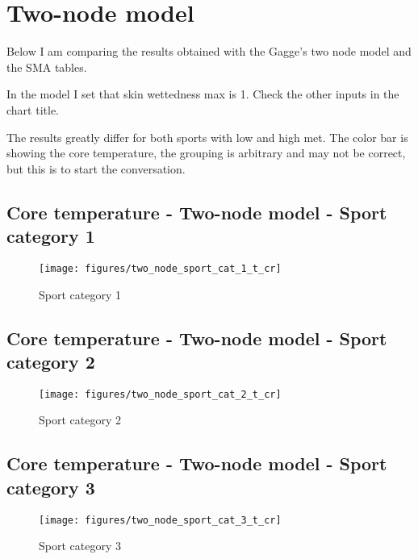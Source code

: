 \documentclass[11pt]{article}
\begin{document}
    \section{Two-node model}\label{sec:two-node-model}

    Below I am comparing the results obtained with the Gagge's two node model and the SMA tables.

    In the model I set that skin wettedness max is 1.
    Check the other inputs in the chart title.

    The results greatly differ for both sports with low and high met.
    The color bar is showing the core temperature, the grouping is arbitrary and may not be correct, but this is to start the conversation.

    \subsection{Core temperature - Two-node model - Sport category 1}
    \begin{figure}[htb!]
        \centering
        \texttt{[image: figures/two\_node\_sport\_cat\_1\_t\_cr]}
        \caption{Sport category 1}\label{fig:two_node_sport_cat_1}
    \end{figure}

    \clearpage

    \subsection{Core temperature - Two-node model - Sport category 2}
    \begin{figure}[htb!]
        \centering
        \texttt{[image: figures/two\_node\_sport\_cat\_2\_t\_cr]}
        \caption{Sport category 2}\label{fig:two_node_sport_cat_2}
    \end{figure}

    \clearpage

    \subsection{Core temperature - Two-node model - Sport category 3}
    \begin{figure}[htb!]
        \centering
        \texttt{[image: figures/two\_node\_sport\_cat\_3\_t\_cr]}
        \caption{Sport category 3}\label{fig:two_node_sport_cat_3}
    \end{figure}

    \clearpage
\end{document}
